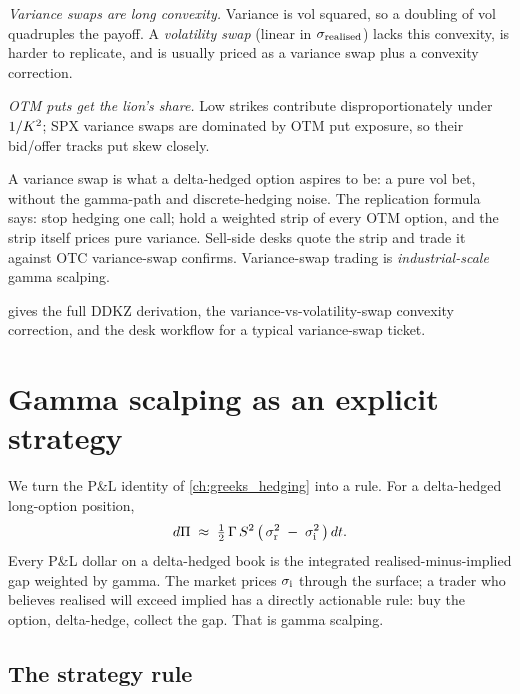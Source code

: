 \emph{Variance swaps are long convexity.} Variance is vol squared,
so a doubling of vol quadruples the payoff. A \emph{volatility
swap} (linear in $\sigma_{\text{realised}}$) lacks this convexity,
is harder to replicate, and is usually priced as a variance swap
plus a convexity correction.

\emph{OTM puts get the lion's share.} Low strikes contribute
disproportionately under $1/K^2$; SPX variance swaps are
dominated by OTM put exposure, so their bid/offer tracks put skew
closely.

\begin{intuitionbox}
A variance swap is what a delta-hedged option aspires to be:
a pure vol bet, without the gamma-path and
discrete-hedging noise. The replication formula says: stop hedging
one call; hold a weighted strip of every OTM option, and the
strip itself prices pure variance. Sell-side desks quote the
strip and trade it against OTC variance-swap confirms.
Variance-swap trading is \emph{industrial-scale} gamma scalping.
\end{intuitionbox}

 gives the full DDKZ derivation, the
variance-vs-volatility-swap convexity correction, and the desk
workflow for a typical variance-swap ticket.

\section{Gamma scalping as an explicit strategy}
\label{sec:ch17_gamma_scalping}

We turn the P\&L identity of \cref{ch:greeks_hedging} into a
rule. For a delta-hedged long-option position,
\begin{equation}
  d\Pi \;\approx\; \tfrac12\,\Gamma\,S^2\,
                   \bigl(\,\sigma_{\text{r}}^2 \;-\; \sigma_{\text{i}}^2\,\bigr)\,dt.
  \label{eq:ch17_vol_trading_eq}
\end{equation}
Every P\&L dollar on a delta-hedged book is the integrated
realised-minus-implied gap weighted by gamma. The market prices
$\sigma_{\text{i}}$ through the surface; a trader who believes
realised will exceed implied has a directly actionable rule: buy
the option, delta-hedge, collect the gap. That is gamma scalping.

\subsection{The strategy rule}
\label{subsec:ch17_gs_rule}

